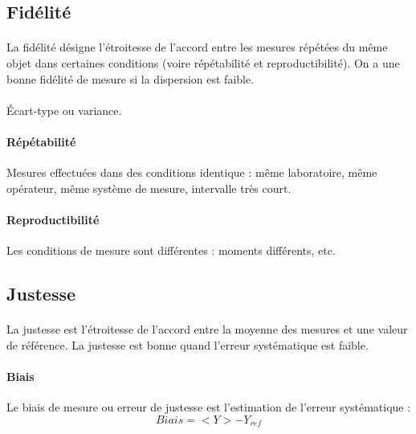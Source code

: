 \documentclass{article}
\begin{document}
        \subsection{Fidélité}
            \paragraph{}
            La fidélité désigne l'étroitesse de l'accord entre les mesures répétées du même objet dans certaines conditions (voire répétabilité et reproductibilité). On a une bonne fidélité de mesure si la dispersion est faible.

            \paragraph{}
            Écart-type ou variance.

            \paragraph{Répétabilité}
            Mesures effectuées dans des conditions identique : même laboratoire, même opérateur, même système de mesure, intervalle très court.

            \paragraph{Reproductibilité}
            Les conditions de mesure sont différentes : moments différents, etc.

        \subsection{Justesse}
            \paragraph{}
            La justesse est l'étroitesse de l'accord entre la moyenne des mesures et une valeur de référence. La justesse est bonne quand l'erreur systématique est faible.

            \paragraph{Biais}
            Le biais de mesure ou erreur de justesse est l'estimation de l'erreur systématique :
            \begin{equation*}
                Biais = <Y> - Y_{ref}
            \end{equation*}
\end{document}
